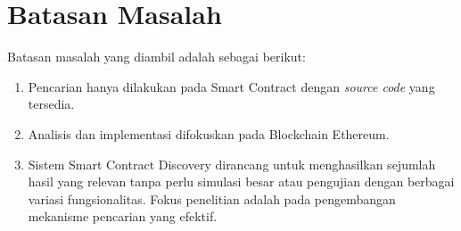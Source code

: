 \section{Batasan Masalah}
\label{sec:batasan-masalah}


Batasan masalah yang diambil adalah sebagai berikut:

\begin{enumerate}
  \item Pencarian hanya dilakukan pada Smart Contract dengan \textit{source code} yang tersedia.
  \item Analisis dan implementasi difokuskan pada Blockchain Ethereum.
  \item Sistem Smart Contract Discovery dirancang untuk menghasilkan sejumlah hasil yang relevan tanpa perlu simulasi besar atau pengujian dengan berbagai variasi fungsionalitas. Fokus penelitian adalah pada pengembangan mekanisme pencarian yang efektif.
\end{enumerate}